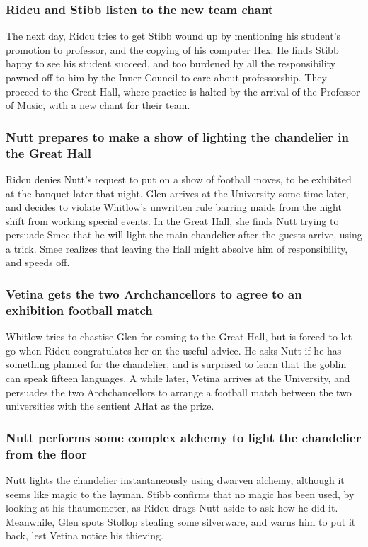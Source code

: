 \subsubsection{\Gls{Ridcu} and \Gls{Stibb} listen to the new team chant}
The next day, \Gls{Ridcu} tries to get \Gls{Stibb} wound up by mentioning his student's promotion
to professor, and the copying of his computer Hex. He finds \Gls{Stibb} happy to see his student
succeed, and too burdened by all the responsibility pawned off to him by the Inner Council to care
about professorship. They proceed to the Great Hall, where practice is halted by the arrival of the
Professor of Music, with a new chant for their team.

\subsubsection{\Gls{Nutt} prepares to make a show of lighting the chandelier in the Great Hall}
\Gls{Ridcu} denies \Gls{Nutt}'s request to put on a show of football moves, to be exhibited at the
banquet later that night. \Gls{Glen} arrives at the University some time later, and decides to
violate \Gls{Whitlow}'s unwritten rule barring maids from the night shift from working special
events. In the Great Hall, she finds \Gls{Nutt} trying to persuade \Gls{Smee} that he will light
the main chandelier after the guests arrive, using a trick. \Gls{Smee} realizes that leaving the
Hall might absolve him of responsibility, and speeds off.

\subsubsection{\Gls{Vetina} gets the two Archchancellors to agree to an exhibition football match}
\Gls{Whitlow} tries to chastise \Gls{Glen} for coming to the Great Hall, but is forced to let go
when \Gls{Ridcu} congratulates her on the useful advice. He asks \Gls{Nutt} if he has something
planned for the chandelier, and is surprised to learn that the goblin can speak fifteen languages.
A while later, \Gls{Vetina} arrives at the University, and persuades the two Archchancellors to
arrange a football match between the two universities with the sentient \Gls{AHat} as the prize.

\subsubsection{\Gls{Nutt} performs some complex alchemy to light the chandelier from the floor}
\Gls{Nutt} lights the chandelier instantaneously using dwarven alchemy, although it seems like magic
to the layman. \Gls{Stibb} confirms that no magic has been used, by looking at his thaumometer, as
\Gls{Ridcu} drags \Gls{Nutt} aside to ask how he did it. Meanwhile, \Gls{Glen} spots \Gls{Stollop}
stealing some silverware, and warns him to put it back, lest \Gls{Vetina} notice his thieving.

